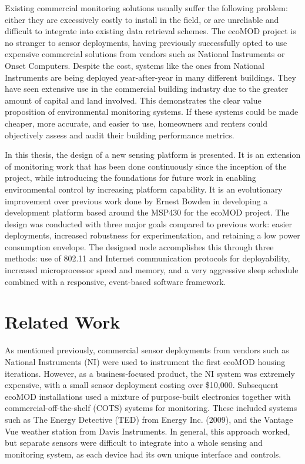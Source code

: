 Existing commercial monitoring solutions usually suffer the following problem: either they are excessively costly to install in the field, or are unreliable and difficult to integrate into existing data retrieval schemes. The ecoMOD project is no stranger to sensor deployments, having previously successfully opted to use expensive commercial solutions from vendors such as National Instruments or Onset Computers. Despite the cost, systems like the ones from National Instruments are being deployed year-after-year in many different buildings. They have seen extensive use in the commercial building industry due to the greater amount of capital and land involved. This demonstrates the clear value proposition of environmental monitoring systems. If these systems could be made cheaper, more accurate, and easier to use, homeowners and renters could objectively assess and audit their building performance metrics.

In this thesis, the design of a new sensing platform is presented. It is an extension of monitoring work that has been done continuously since the inception of the project, while introducing the foundations for future work in enabling environmental control by increasing platform capability. It is an evolutionary improvement over previous work done by Ernest Bowden in developing a development platform based around the MSP430 for the ecoMOD project\cite{Bowden2009}. The design was conducted with three major goals compared to previous work: easier deployments, increased robustness for experimentation, and retaining a low power consumption envelope. The designed node accomplishes this through three methods: use of 802.11 and Internet communication protocols for deployability, increased microprocessor speed and memory, and a very aggressive sleep schedule combined with a responsive, event-based software framework.

\section{Related Work}

As mentioned previously, commercial sensor deployments from vendors such as National Instruments (NI) were used to instrument the first ecoMOD housing iterations\cite{Kidd2007}. However, as a business-focused product, the NI system was extremely expensive, with a small sensor deployment costing over \$10,000. Subsequent ecoMOD installations used a mixture of purpose-built electronics together with commercial-off-the-shelf (COTS) systems for monitoring. These included systems such as The Energy Detective (TED) from Energy Inc. (2009), and the Vantage Vue weather station from Davis Instruments. In general, this approach worked, but separate sensors were difficult to integrate into a whole sensing and monitoring system, as each device had its own unique interface and controls.

